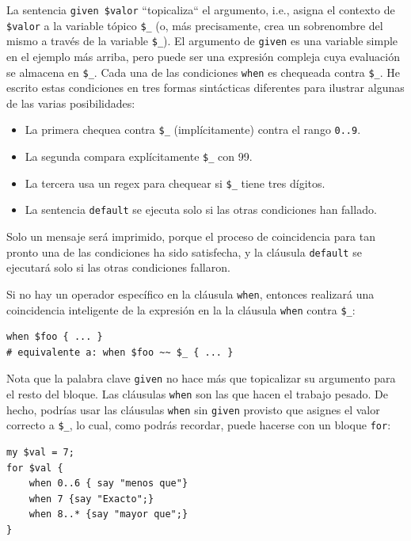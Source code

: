 La sentencia \verb|given $valor| ``topicaliza`` el argumento, i.e., 
asigna el contexto de \verb|$valor| a la variable tópico \verb|$_|
(o, más precisamente, crea un sobrenombre del mismo a través de 
la variable \verb|$_|). El argumento de {\tt given} es una variable simple
en el ejemplo más arriba, pero puede ser una expresión compleja cuya evaluación
se almacena en \verb|$_|. Cada una de las condiciones {\tt when} es
chequeada contra \verb|$_|. He escrito estas condiciones en tres formas
sintácticas diferentes para ilustrar algunas de las varias posibilidades:
\begin{itemize}
\item La primera chequea contra \verb|$_| (implícitamente) contra el
rango \verb|0..9|.
\item La segunda compara explícitamente \verb|$_| con 99.
\item La tercera usa un regex para chequear si \verb|$_| tiene
tres dígitos.
\item La sentencia \verb|default| se ejecuta solo si las otras condiciones
han fallado.
\end{itemize}

Solo un mensaje será imprimido, porque el proceso de coincidencia para tan
pronto una de las condiciones ha sido satisfecha, y la cláusula \verb|default|
se ejecutará solo si las otras condiciones fallaron.

Si no hay un operador específico en la cláusula {\tt when}, entonces realizará
una coincidencia inteligente de la expresión en la la cláusula {\tt when} contra
 \verb|$_|:

\begin{verbatim}
when $foo { ... }
# equivalente a: when $foo ~~ $_ { ... }
\end{verbatim}

Nota que la palabra clave {\tt given} no hace más que topicalizar
su argumento para el resto del bloque. Las cláusulas {\tt when} son las
que hacen el trabajo pesado. De hecho, podrías usar las cláusulas {\tt when}
sin {\tt given} provisto que asignes el valor correcto a \verb|$_|, lo cual,
como podrás recordar, puede hacerse con un bloque {\tt for}:

\begin{verbatim}
my $val = 7;
for $val { 
    when 0..6 { say "menos que"}
    when 7 {say "Exacto";} 
    when 8..* {say "mayor que";}
}
\end{verbatim}

